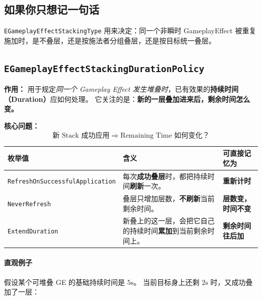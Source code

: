 \subsection{如果你只想记一句话}

\texttt{EGameplayEffectStackingType} 用来决定：同一个非瞬时 GameplayEffect 被重复施加时，是不叠层，还是按施法者分组叠层，还是按目标统一叠层。



\subsection{\texttt{EGameplayEffectStackingDurationPolicy}}

\textbf{作用：}
用于规定\emph{同一个 Gameplay Effect 发生堆叠时}，已有效果的\textbf{持续时间（Duration）}应如何处理。  
它关注的是：\textbf{新的一层叠加进来后，剩余时间怎么变。}

\vspace{0.5em}
\textbf{核心问题：}
\[
\text{新 Stack 成功应用} \;\Longrightarrow\; \text{Remaining Time 如何变化？}
\]

\begin{longtable}{@{}p{}p{}p{}@{}}
	\toprule
	\textbf{枚举值} & \textbf{含义} & \textbf{可直接记忆为} \\
	\midrule
	\endhead
	
	\texttt{RefreshOnSuccessfulApplication}
	&
	每次\textbf{成功叠层}时，都把持续时间\textbf{刷新}一次。
	&
	\textbf{重新计时} \\
	
	\texttt{NeverRefresh}
	&
	叠层只增加层数，\textbf{不刷新}当前剩余时间。
	&
	\textbf{层数变，时间不变} \\
	
	\texttt{ExtendDuration}
	&
	新叠上的这一层，会把它自己的持续时间\textbf{累加}到当前剩余时间上。
	&
	\textbf{剩余时间往后加} \\
	
	\bottomrule
\end{longtable}

\paragraph{直观例子}
假设某个可堆叠 GE 的基础持续时间是 $5\text{s}$。  
当前目标身上还剩 $2\text{s}$ 时，又成功叠加了一层：

